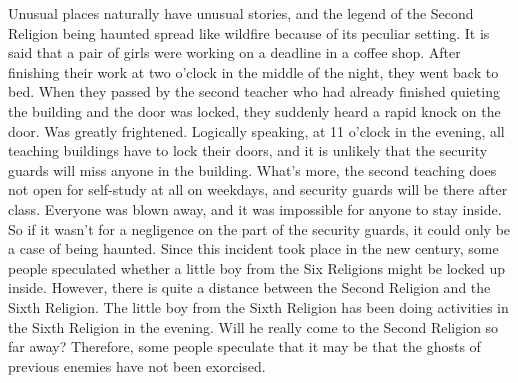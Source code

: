Unusual places naturally have unusual stories, and the legend of the Second
Religion being haunted spread like wildfire because of its peculiar setting.
It is said that a pair of girls were working on a deadline in a coffee shop.
After finishing their work at two o'clock in the middle of the night, they went
back to bed. When they passed by the second teacher who had already finished
quieting the building and the door was locked, they suddenly heard a rapid
knock on the door. Was greatly frightened.  Logically speaking, at 11 o'clock
in the evening, all teaching buildings have to lock their doors, and it is
unlikely that the security guards will miss anyone in the building. What's
more, the second teaching does not open for self-study at all on weekdays, and
security guards will be there after class. Everyone was blown away, and it was
impossible for anyone to stay inside. So if it wasn't for a negligence on the
part of the security guards, it could only be a case of being haunted.  Since
this incident took place in the new century, some people speculated whether a
little boy from the Six Religions might be locked up inside. However, there is
quite a distance between the Second Religion and the Sixth Religion. The little
boy from the Sixth Religion has been doing activities in the Sixth Religion in
the evening. Will he really come to the Second Religion so far away?
Therefore, some people speculate that it may be that the ghosts of previous
enemies have not been exorcised.

